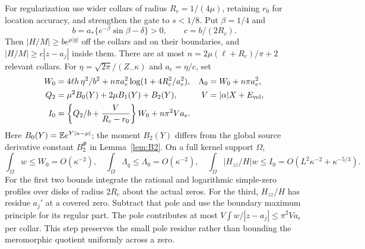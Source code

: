 For regularization use wider collars of radius $R_c=1/(4\mu)$,
retaining $r_0$ for location accuracy, and strengthen the gate to
$s<1/8$. Put $\beta=1/4$ and
\[
 b=a_*\{e^{-\beta}\sin\beta-\delta\}>0,\qquad c=b/(2R_c).
\]
Then $|H/M|\ge be^{\mu|y|}$ off the collars and on their boundaries,
and $|H/M|\ge c|z-a_j|$ inside them.
There are at most $n=2\mu(\ell+R_c)/\pi+2$ relevant collars.
For $\eta=\sqrt{2\pi}/(Z_-\kappa)$ and $a_e=\eta/c$, set
\begin{align}
 W_0&=4\ell h\,\eta^2/b^2
              +n\pi a_e^2\log(1+4R_c^2/a_e^2),&
 \Lambda_0&=W_0+n\pi a_e^2,\label{eq:collarintegrals}\\
 Q_2&=\mu^2B_0(Y)+2\mu B_1(Y)+B_2(Y),&
 V&=|\alpha|X+E_{\rm vel},\notag\\
 I_0&=\left\{Q_2/b+\frac{V}{R_c-r_0}\right\}W_0
                                      +n\pi^2Va_e.\label{eq:poleintegral}
\end{align}
Here $B_0(Y)=\mathbb E e^{Y|u-\mu|}$; the moment $B_2(Y)$ differs from
the global source derivative constant $B_2^{\Phi}$ in Lemma~\ref{lem:B2}.
On a full kernel support $\Omega$,
\begin{equation}
 \int_\Omega w\le W_0=O(\kappa^{-2}),\quad
 \int_\Omega\Lambda_q\le\Lambda_0=O(\kappa^{-2}),\quad
 \int_\Omega|H_{zz}/H|w\le I_0
             =O(L^2\kappa^{-2}+\kappa^{-5/3}).
 \label{eq:weakorders}
\end{equation}
For the first two bounds integrate the rational and logarithmic
simple-zero profiles over disks of radius $2R_c$ about the actual zeros.
For the third, $H_{zz}/H$ has residue $a_j'$ at a covered zero.
Subtract that pole and use the boundary maximum principle for its
regular part. The pole contributes at most
$V\int w/|z-a_j|\le\pi^2Va_e$ per collar.
This step preserves the small pole residue rather than bounding the
meromorphic quotient uniformly across a zero.


